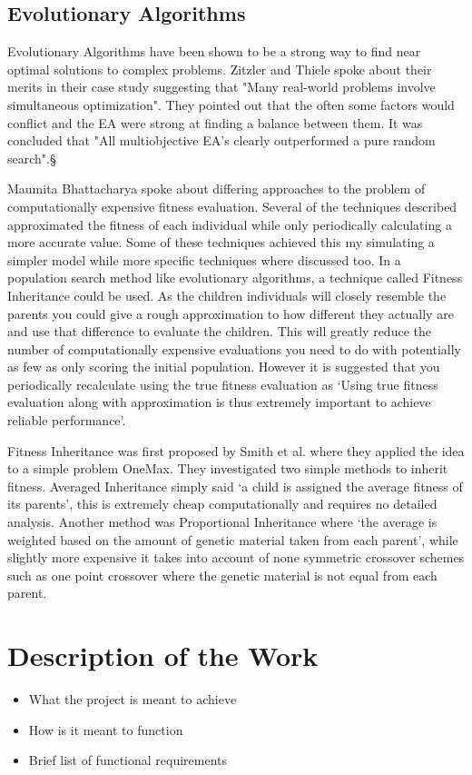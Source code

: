 \documentclass[a4paper]{article}
\begin{document}
\subsection{Evolutionary Algorithms}
Evolutionary Algorithms have been shown to be a strong way to find near optimal solutions to complex problems. Zitzler and Thiele spoke about their merits in their case study suggesting that "Many real-world problems involve simultaneous optimization"\cite{EACaseStudy}. They pointed out that the often some factors would conflict and the EA were strong at finding a balance between them. It was concluded that "All multiobjective EA's clearly outperformed a pure random search"\cite{EACaseStudy}.§
\par
Maumita Bhattacharya spoke about differing approaches to the problem of computationally expensive fitness evaluation\cite{expensiveOptimisation}.
Several of the techniques described approximated the fitness of each individual while only periodically calculating a more accurate value.
Some of these techniques achieved this my simulating a simpler model while more specific techniques where discussed too.
In a population search method like evolutionary algorithms, a technique called Fitness Inheritance could be used.
As the children individuals will closely resemble the parents you could give a rough approximation to how different they actually are and use that difference to evaluate the children.
This will greatly reduce the number of computationally expensive evaluations you need to do with potentially as few as only scoring the initial population.
However it is suggested that you periodically recalculate using the true fitness evaluation as `Using true fitness evaluation along with approximation is thus extremely important to achieve reliable performance'.
\par
Fitness Inheritance was first proposed by Smith et al.\cite{fitnessInheritance} where they applied the idea to a simple problem OneMax.
They investigated two simple methods to inherit fitness.
Averaged Inheritance simply said `a child is assigned the average fitness of its parents', this is extremely cheap computationally and requires no detailed analysis.
Another method was Proportional Inheritance where `the average is weighted based on the amount of genetic material taken from each parent', while slightly more expensive it takes into account of none symmetric crossover schemes such as one point crossover where the genetic material is not equal from each parent.

\section{Description of the Work}
\begin{itemize}
    \item What the project is meant to achieve
	\item How is it meant to function
	\item Brief list of functional requirements
\end{itemize}
\end{document}
